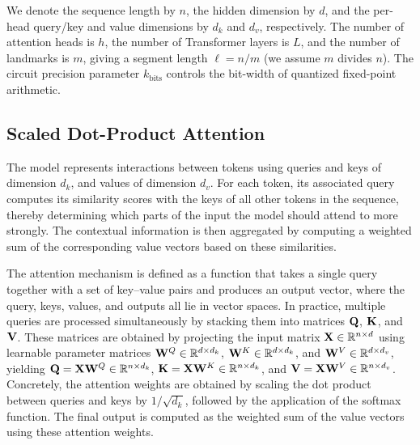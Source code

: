 \documentclass[sigconf,anonymous,review,balance=false]{acmart}
\newcommand{\rev}[1]{{\color{magenta}#1}}
\begin{document}
We denote the sequence length by $n$, the hidden dimension by $d$, and the per-head query/key and value dimensions by $d_k$ and $d_v$, respectively. The number of attention heads is $h$, the number of Transformer layers is $L$, and the number of landmarks is $m$, giving a segment length $\ell = n/m$ \rev{(we assume $m$ divides $n$)}. The circuit precision parameter $k_{\text{bits}}$ controls the bit-width of quantized fixed-point arithmetic. %

\subsection{Scaled Dot-Product Attention}
The model represents interactions between tokens using queries and keys of dimension $d_k$, and values of dimension $d_v$. For each token, its associated query computes its similarity scores with the keys of all other tokens in the sequence, thereby determining which parts of the input the model should attend to more strongly. The contextual information is then aggregated by computing a weighted sum of the corresponding value vectors based on these similarities.

The attention mechanism is defined as a function that takes a single query together with a set of key–value pairs and produces an output vector, where the query, keys, values, and outputs all lie in vector spaces. In practice, multiple queries are processed simultaneously by stacking them into matrices ${\mathbf{Q}}$, ${\mathbf{K}}$, and ${\mathbf{V}}$. These matrices are obtained by projecting the input matrix ${\mathbf{X}} \in \mathbb{R}^{n \times d}$ using learnable parameter matrices ${\mathbf{W}}^Q \in \mathbb{R}^{d \times d_k}$, ${\mathbf{W}}^K \in \mathbb{R}^{d \times d_k}$, and ${\mathbf{W}}^V \in \mathbb{R}^{d \times d_v}$, yielding ${\mathbf{Q}} = {\mathbf{X}} {\mathbf{W}}^Q \in \mathbb{R}^{n \times d_k}$, ${\mathbf{K}} = {\mathbf{X}} {\mathbf{W}}^K \in \mathbb{R}^{n \times d_k}$, and ${\mathbf{V}} = {\mathbf{X}} {\mathbf{W}}^V \in \mathbb{R}^{n \times d_v}$. Concretely, the attention weights are obtained by scaling the dot product between queries and keys by $1/\sqrt{d_k}$, followed by the application of the softmax function. The final output is computed as the weighted sum of the value vectors using these attention weights.
\end{document}
